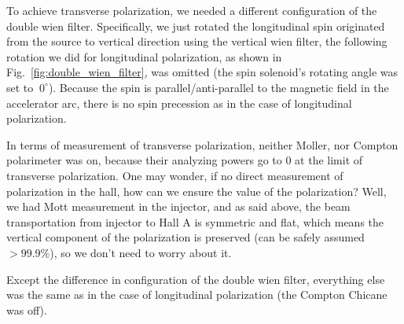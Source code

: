 To achieve transverse polarization, we needed a different configuration of the
double wien filter. Specifically, we just rotated the longitudinal spin originated
from the source to vertical direction using the vertical wien filter, the 
following rotation we did for longitudinal polarization, as shown in 
Fig.~\ref{fig:double_wien_filter}, was omitted (the spin solenoid's rotating
angle was set to $~0^\circ$). Because the spin is parallel/anti-parallel
to the magnetic field in the accelerator arc, there is no spin precession as in
the case of longitudinal polarization. 

In terms of measurement of transverse polarization, neither Moller, nor Compton
polarimeter was on, because their analyzing powers go to 0 at the limit of transverse
polarization. One may wonder, if no direct measurement of polarization in the 
hall, how can we ensure the value of the polarization? Well, we had Mott measurement
in the injector, and as said above, the beam transportation from injector to Hall A
is symmetric and flat, which means the vertical component of the polarization
is preserved (can be safely assumed $>99.9\%$), so we don't need to worry about it.

Except the difference in configuration of the double wien filter, everything 
else was the same as in the case of longitudinal polarization (the Compton Chicane
was off). 

